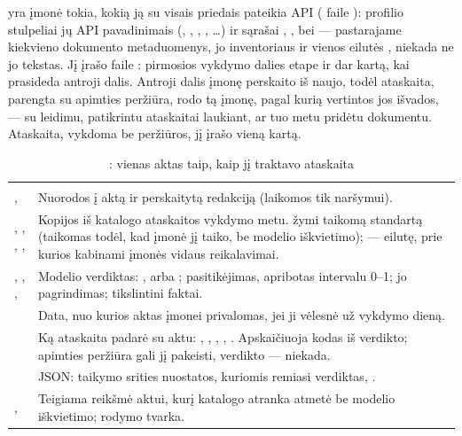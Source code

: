  yra įmonė tokia, kokią ją su visais priedais pateikia API
( faile ):
profilio stulpeliai jų API pavadinimais (, ,
, , \dots) ir sąrašai ,
,  bei  --- pastarajame kiekvieno dokumento
metaduomenys, jo inventoriaus  ir vienos eilutės ,
niekada ne jo tekstas. Jį įrašo  faile :
pirmosios vykdymo dalies etape  ir dar kartą, kai prasideda antroji dalis. Antroji
dalis įmonę perskaito iš naujo, todėl ataskaita, parengta su apimties peržiūra, rodo tą įmonę,
pagal kurią vertintos jos išvados, --- su leidimu, patikrintu ataskaitai laukiant, ar tuo metu
pridėtu dokumentu. Ataskaita, vykdoma be peržiūros, jį įrašo vieną kartą.

\begin{xltabular}{\textwidth}{@{}L{38mm}Y@{}}
\caption{: vienas aktas taip, kaip jį traktavo ataskaita}\label{tab:data:ra}\\
\toprule
{} &  \\
\midrule
\endfirsthead
\toprule
{} &  \\
\midrule
\endhead
\bottomrule
\endlastfoot
{},  & Nuorodos į aktą ir perskaitytą redakciją (laikomos tik naršymui). \\
, , , ,  & Kopijos iš katalogo ataskaitos vykdymo metu.   žymi taikomą standartą (taikomas todėl, kad įmonė jį taiko, be modelio iškvietimo);  --- eilutę, prie kurios kabinami įmonės vidaus reikalavimai. \\
, , ,  & Modelio verdiktas: ,  arba ; pasitikėjimas, apribotas intervalu 0–1; jo pagrindimas; tikslintini faktai. \\
 & Data, nuo kurios aktas įmonei privalomas, jei ji vėlesnė už vykdymo dieną. \\
 & Ką ataskaita padarė su aktu: , , , , . Apskaičiuoja kodas iš verdikto; apimties peržiūra gali jį pakeisti, verdikto --- niekada. \\
 & JSON: taikymo srities nuostatos, kuriomis remiasi verdiktas, . \\
,  & Teigiama reikšmė aktui, kurį katalogo atranka atmetė be modelio iškvietimo; rodymo tvarka. \\
\end{xltabular}

